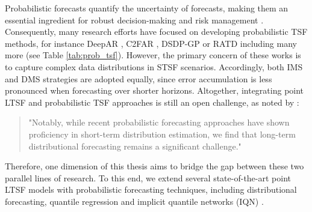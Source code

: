 \documentclass[a4paper,oneside,bibliography=totoc]{scrbook}
\begin{document}
\noindent
Probabilistic forecasts quantify the uncertainty of forecasts, making them an essential ingredient for robust decision-making and risk management \cite{gneiting_probabilistic_2014}.
Consequently, many research efforts have focused on developing probabilistic TSF methods, for instance DeepAR \cite{salinas_deepar_2020}, C2FAR \cite{bergsma_c2far_2022}, DSDP-GP \cite{bilos_modeling_2023} or RATD \cite{liu_retrieval-augmented_2024} including many more (see Table \ref{tab:prob_tsf}).
However, the primary concern of these works is to capture complex data distributions in STSF scenarios. Accordingly, both IMS and DMS strategies are adopted equally, since error accumulation is less pronounced when forecasting over shorter horizons.
Altogether, integrating point LTSF and probabilistic TSF approaches is still an open challenge, as noted by \citet{zhang_probts_2024}:
\begin{quote}
"Notably, while recent probabilistic forecasting approaches have shown proficiency in short-term distribution estimation, we find that long-term distributional forecasting remains a significant challenge." \cite{zhang_probts_2024}
\end{quote}
Therefore, one dimension of this thesis aims to bridge the gap between these two parallel lines of research. 
To this end, we extend several state-of-the-art point LTSF models with probabilistic forecasting techniques, including distributional forecasting, quantile regression and implicit quantile networks (IQN) \cite{dabney_implicit_2018, gouttes_probabilistic_2021}.
\newline
\end{document}
